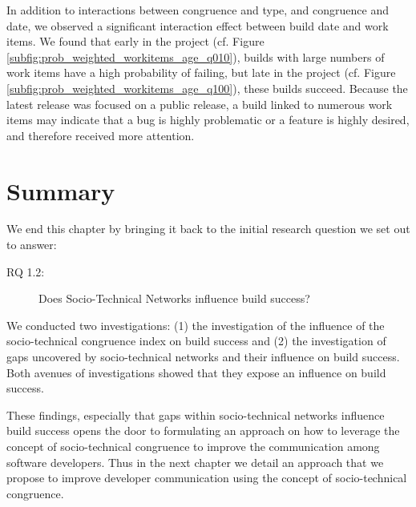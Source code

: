 In addition to interactions between congruence and type, and congruence and date, we observed a significant interaction effect between build date and work items.
We found that early in the project (cf. Figure \ref{subfig:prob_weighted_workitems_age_q010}), builds with large numbers of work items have a high probability of failing, but late in the project (cf. Figure \ref{subfig:prob_weighted_workitems_age_q100}), these builds succeed. Because the latest release was focused on a public release, a build linked to numerous work items may indicate that a bug is highly problematic or a feature is highly desired, and therefore received more attention. 



\section{Summary}
\label{sec:conclusion}
We end this chapter by bringing it back to the initial research question we set out to answer:
\begin{description}
  \item[RQ 1.2:] Does Socio-Technical Networks influence build success?
\end{description}

We conducted two investigations: (1) the investigation of the influence of the socio-technical congruence index on build success and (2) the investigation of gaps uncovered by socio-technical networks and their influence on build success.
Both avenues of investigations showed that they expose an influence on build success.

These findings, especially that gaps within socio-technical networks influence build success opens the door to formulating an approach on how to leverage the concept of socio-technical congruence to improve the communication among software developers.
Thus in the next chapter we detail an approach that we propose to improve developer communication using the concept of socio-technical congruence.

